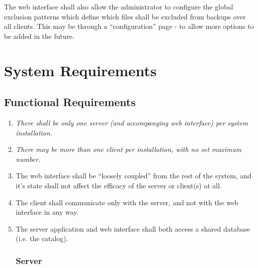 The web interface shall also allow the administrator to configure the global
exclusion patterns which define which files shall be excluded from backups over
all clients. This may be through a ``configuration'' page - to allow more
options to be added in the future.


\section{System Requirements}
\label{sec:specification-system-requirements}

\subsection{Functional Requirements}

\begin{enumerate}

\renewcommand{\theenumi}{\arabic{enumi}}
\renewcommand{\labelenumi}{\textsc{FuncReq}$\theenumi$.}

\subsubsection{Architecture}

    \item \emph{There shall be only one server (and accompanying web interface)
        per system installation.}
    \item \emph{There may be more than one client per installation, with no set
        maximum number.}
    \item The web interface shall be ``loosely coupled'' from the rest of the
        system, and it's state shall not affect the efficacy of the server or
        client(s) at all.
    \item The client shall communicate only with the server, and not with the
        web interface in any way.
    \item The server application and web interface shall both access a shared
        database (i.e. the catalog).

\subsubsection{Server}


\end{enumerate}
